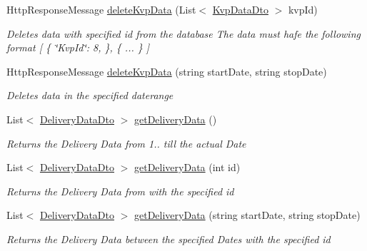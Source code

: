 \begin{DoxyCompactItemize}
Http\+Response\+Message \hyperlink{classkpi_mvc_api_1_1_controllers_1_1_kpidata_controller_a42bfeef2bf903c70d9d8452367ed6dd0}{delete\+Kvp\+Data} (List$<$ \hyperlink{classkpi_mvc_api_1_1_data_transfer_objects_1_1_kvp_data_dto}{Kvp\+Data\+Dto} $>$ kvp\+Id)
\begin{DoxyCompactList}\small\item\em Deletes data with specified id from the database The data must hafe the following format \mbox{[} \{ \char`\"{}\+Kvp\+Id\char`\"{}\+: 8, \}, \{ ... \} \mbox{]} \end{DoxyCompactList}\item 
Http\+Response\+Message \hyperlink{classkpi_mvc_api_1_1_controllers_1_1_kpidata_controller_a39dbc332ddee57f0a7bda5d724a0d694}{delete\+Kvp\+Data} (string start\+Date, string stop\+Date)
\begin{DoxyCompactList}\small\item\em Deletes data in the specified daterange \end{DoxyCompactList}\item 
List$<$ \hyperlink{classkpi_mvc_api_1_1_data_transfer_objects_1_1_delivery_data_dto}{Delivery\+Data\+Dto} $>$ \hyperlink{classkpi_mvc_api_1_1_controllers_1_1_kpidata_controller_a731d149b7c58ba7de0a45c2eb3110fe1}{get\+Delivery\+Data} ()
\begin{DoxyCompactList}\small\item\em Returns the Delivery Data from 1.. till the actual Date \end{DoxyCompactList}\item 
List$<$ \hyperlink{classkpi_mvc_api_1_1_data_transfer_objects_1_1_delivery_data_dto}{Delivery\+Data\+Dto} $>$ \hyperlink{classkpi_mvc_api_1_1_controllers_1_1_kpidata_controller_a63c0c7c25b53904dbae7786dd66285e4}{get\+Delivery\+Data} (int id)
\begin{DoxyCompactList}\small\item\em Returns the Delivery Data from with the specified id \end{DoxyCompactList}\item 
List$<$ \hyperlink{classkpi_mvc_api_1_1_data_transfer_objects_1_1_delivery_data_dto}{Delivery\+Data\+Dto} $>$ \hyperlink{classkpi_mvc_api_1_1_controllers_1_1_kpidata_controller_aa080da542869888b3e45666e7e751b72}{get\+Delivery\+Data} (string start\+Date, string stop\+Date)
\begin{DoxyCompactList}\small\item\em Returns the Delivery Data between the specified Dates with the specified id \end{DoxyCompactList}\item 

\end{DoxyCompactItemize}
